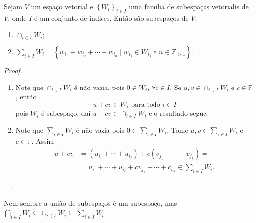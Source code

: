 
\begin{proposition}
	Sejam $V$ um espaço vetorial e ${\left\{W_{i}\right\}}_{i\in I}$
	uma família de subespaços vetorialis de $V$, onde $I$ é um conjunto
	de índices.
	Então são subespaços de $V$:
	\begin{enumerate}
		\item

		      \begin{math}
			      \cap_{i\in I}W_{i}
		      \end{math};

		\item

		      \begin{math}
			      \sum_{i\in I}W_{i}=
			      \left\{
			      w_{i_{1}}+w_{i_{2}}+\dotsb+w_{i_{n}}
			      \mid w_{i_{j}}\in W_{i_{j}}
			      \text{ e }
			      n\in\mathbb{Z}_{>1}
			      \right\}
		      \end{math}.
	\end{enumerate}
\end{proposition}

\begin{proof}
	\begin{enumerate}\leavevmode
		\item Note que $\cap_{i\in I}W_{i}$ é não vazia, pois $0\in W_{i}$,
		      $\forall i\in I$.
		      Se $u,v\in\cap_{i\in I}W_{i}$ e $c\in\mathbb{F}$, então
		      \[
			      u+cv\in W_{i}
			      \text{ para todo }
			      i\in I
		      \]
		      pois $W_{i}$ é subespaço, daí $u+cv\in\cap_{i\in I}W_{i}$ e o
		      resultado segue.
		\item Note que $\sum_{i\in I}W_{i}$ é não vazia pois $0\in\sum_{i\in I}W_{i}$.
		      Tome $u,v\in\sum_{i\in I}W_{i}$ e $c\in\mathbb{F}$.
		      Assim
		      \begin{align*}
			      u+cv & =
			      \left(u_{i_{1}}+\dotsb+u_{i_{\ell}}\right)+
			      c\left(v_{j_{1}}+\dotsb+v_{j_{k}}\right)= \\
			           & =
			      u_{i_{1}}+\dotsb+u_{i_{\ell}}+cv_{j_{1}}+\dotsb+c_{v_{k}}\in\sum_{i\in I}W_{i}.
		      \end{align*}
	\end{enumerate}
\end{proof}


\begin{remark}
	Nem sempre a união de subespaços é um subespaço, mas
	\begin{math}
		\bigcap_{i\in I}W_{i}\subseteq
		\cup_{i\in I}W_{i}\subseteq
		\sum_{i\in I}W_{i}
	\end{math}.
\end{remark}

